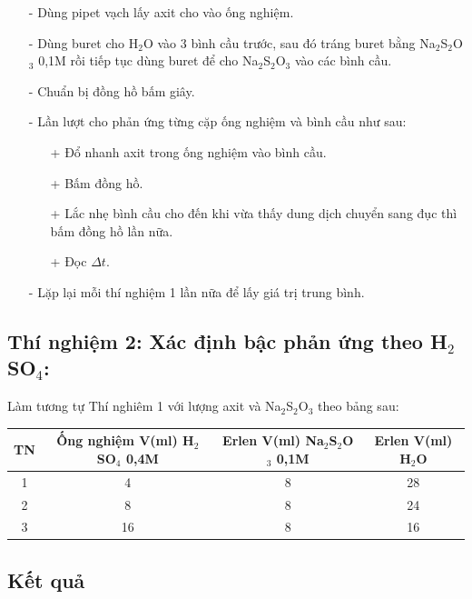 \documentclass[12pt,a4paper]{report}
\begin{document}
\begin{itemize}
    \item[-] Dùng pipet vạch lấy axit cho vào ống nghiệm.
    \item[-] Dùng buret cho H$_2$O vào 3 bình cầu trước, sau đó tráng buret bằng Na$_2$S$_2$O$_3$ 0,1M rồi tiếp tục dùng buret để cho Na$_2$S$_2$O$_3$ vào các bình cầu.
    \item[-] Chuẩn bị đồng hồ bấm giây.
    \item[-] Lần lượt cho phản ứng từng cặp ống nghiệm và bình cầu như sau:
    \begin{itemize}
        \item[+] Đổ nhanh axit trong ống nghiệm vào bình cầu.
        \item[+] Bấm đồng hồ.
        \item[+] Lắc nhẹ bình cầu cho đến khi vừa thấy dung dịch chuyển sang đục thì bấm đồng hồ lần nữa.
        \item[+] Đọc $\Delta t$.
    \end{itemize}
    \item[-] Lặp lại mỗi thí nghiệm 1 lần nữa để lấy giá trị trung bình.
\end{itemize}

\subsection*{Thí nghiệm 2: Xác định bậc phản ứng theo H$_2$SO$_4$:}

Làm tương tự Thí nghiêm 1 với lượng axit và Na$_2$S$_2$O$_3$ theo bảng sau:

\begin{center}
\begin{tabular}{|c|c|c|c|}
\hline
TN & Ống nghiệm V(ml) H$_2$SO$_4$ 0,4M & Erlen V(ml) Na$_2$S$_2$O$_3$ 0,1M & Erlen V(ml) H$_2$O \\
\hline
1 & 4 & 8 & 28 \\
2 & 8 & 8 & 24 \\
3 & 16 & 8 & 16 \\
\hline
\end{tabular}
\end{center}
\newpage
\subsection{Kết quả}
\end{document}

